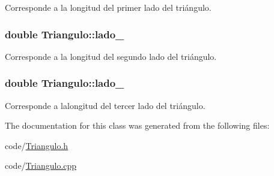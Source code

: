 Corresponde a la longitud del primer lado del triángulo. 

\hypertarget{class_triangulo_abec4003e2b29d33419dd928e2d0bdb4f}{
\subsubsection[{lado\+\_\+2}]{\setlength{\rightskip}{0pt plus 5cm}double Triangulo\+::lado\+\_}}\label{class_triangulo_abec4003e2b29d33419dd928e2d0bdb4f}


Corresponde a la longitud del segundo lado del triángulo. 

\hypertarget{class_triangulo_a4af14f654b0ddcf6415c0e11a2718fce}{
\subsubsection[{lado\+\_\+3}]{\setlength{\rightskip}{0pt plus 5cm}double Triangulo\+::lado\+\_}}\label{class_triangulo_a4af14f654b0ddcf6415c0e11a2718fce}


Corresponde a lalongitud del tercer lado del triángulo. 



The documentation for this class was generated from the following files\+:\begin{DoxyCompactItemize}
\item 
code/\hyperlink{_triangulo_8h}{Triangulo.\+h}\item 
code/\hyperlink{_triangulo_8cpp}{Triangulo.\+cpp}\end{DoxyCompactItemize}
